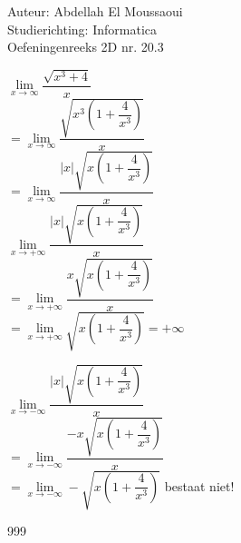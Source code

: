 \documentclass[a4paper]{article}
\begin{document}
  
\noindent \large Auteur: Abdellah El Moussaoui \\
\noindent \large Studierichting: Informatica\\
\noindent \large Oefeningenreeks 2D nr. 20.3\\

\medskip

\normalsize

$\lim\limits_{x \rightarrow \infty} \dfrac{\sqrt{x^3 + 4}}{x}$\\

$= \lim\limits_{x \rightarrow \infty} \dfrac{\sqrt{x^3 \left(1 + \dfrac{4}{x^3}\right)}}{x}$\\

$= \lim\limits_{x \rightarrow \infty} \dfrac{\left |x \right|\sqrt{x \left(1 + \dfrac{4}{x^3}\right)}}{x}$\\

\medskip
$\lim\limits_{x \rightarrow +\infty} \dfrac{\left |x \right|\sqrt{x \left(1 + \dfrac{4}{x^3}\right)}}{x}$\\

$ = \lim\limits_{x \rightarrow +\infty} \dfrac{x \sqrt{x \left(1 + \dfrac{4}{x^3}\right)}}{x}$\\

$ = \lim\limits_{x \rightarrow +\infty}  \sqrt{x \left(1 + \dfrac{4}{x^3}\right)}= +\infty$\\
\medskip

$\lim\limits_{x \rightarrow -\infty} \dfrac{\left |x \right|\sqrt{x \left(1 + \dfrac{4}{x^3}\right)}}{x}$\\

$ = \lim\limits_{x \rightarrow -\infty} \dfrac{-x \sqrt{x \left(1 + \dfrac{4}{x^3}\right)}}{x}$\\

$ = \lim\limits_{x \rightarrow -\infty}  -\sqrt{x \left(1 + \dfrac{4}{x^3}\right)}$
bestaat niet! 


\begin{thebibliography}{999}
\end{thebibliography}
\end{document}
